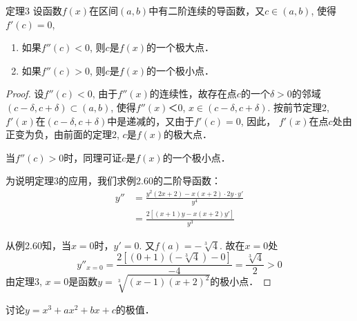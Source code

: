 \begin{solution}
\begin{figure}[htp]
    \caption{}
\end{figure}
\end{solution}

\begin{blk}
{定理3} 设函数$f(x)$在区间$(a,b)$中有二阶连续的导函数，又$c\in (a,b)$, 使得$f' (c) =0$,
\begin{enumerate}
    \item 如果$f''(c)<0$, 则$c$是$f(x)$的一个极大点．
    \item 如果$f''(c)>0$, 则$c$是$f(x)$的一个极小点．
\end{enumerate}
\end{blk}

\begin{proof}
设$f''(c)<0$, 由于$f''(x)$的连续性，故存在点$c$的一个$\delta>0$的邻域$(c-\delta,c+\delta)\subset (a,b)$, 使得$f''(x)＜0$, $x\in (c-\delta,c+\delta)$. 按前节定理2, $f'(x)$在$(c-\delta,c+\delta)$中是递减的，又由于$f'(c)=0$, 因此，
$f'(x)$在点$c$处由正变为负，由前面的定理2, $c$是$f(x)$的极大点．

当$f''(c)>0$时，同理可证$c$是$f(x)$的一个极小点．

为说明定理3的应用，我们求例2.60的二阶导函数：
\begin{align*}
   y''&=\frac{y^2 (2x+2) -x (x+2) \cdot 2y\cdot y'}{y^4}\\
&=\frac{2 [ (x+1) y-x (x+2) y']}{y^3} 
\end{align*}

从例2.60知，当$x=0$时，$y'=0$. 又$f(a)=-\sqrt[3]{4}$. 故在$x=0$处
\[y''_{x=0}=\frac{2\left[(0+1)\left(-\sqrt[3]{4}\right)-0\right]}{-4}=\frac{\sqrt[3]{4}}{2}>0\]
由定理3, $x=0$是函数$y=\sqrt[3]{(x-1)(x+2)^2}$的极小点．
\end{proof}




\begin{example}
    讨论$y=x^3+ax^2+bx+c$的极值．
\end{example}


